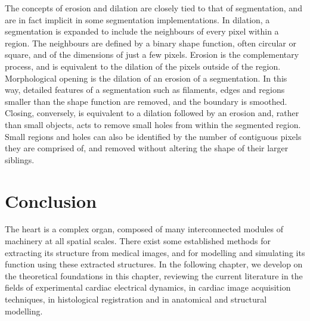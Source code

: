     The concepts of erosion and dilation are closely tied to that of segmentation, and are in fact implicit in some segmentation implementations. In dilation, a segmentation is expanded to include the neighbours of every pixel within a region. The neighbours are defined by a binary shape function, often circular or square, and of the dimensions of just a few pixels. Erosion is the complementary process, and is equivalent to the dilation of the pixels outside of the region. Morphological opening is the dilation of an erosion of a segmentation. In this way, detailed features of a segmentation such as filaments, edges and regions smaller than the shape function are removed, and the boundary is smoothed. Closing, conversely, is equivalent to a dilation followed by an erosion and, rather than small objects, acts to remove small holes from within the segmented region. Small regions and holes can also be identified by the number of contiguous pixels they are comprised of, and removed without altering the shape of their larger siblings.
  
  
\section{Conclusion} %
\label{sec:conclusion}
  The heart is a complex organ, composed of many interconnected modules of machinery at all spatial scales. There exist some established methods for extracting its structure from medical images, and for modelling and simulating its function using these extracted structures. In the following chapter, we develop on the theoretical foundations in this chapter, reviewing the current literature in the fields of experimental cardiac electrical dynamics, in cardiac image acquisition techniques, in histological registration and in anatomical and structural modelling.

